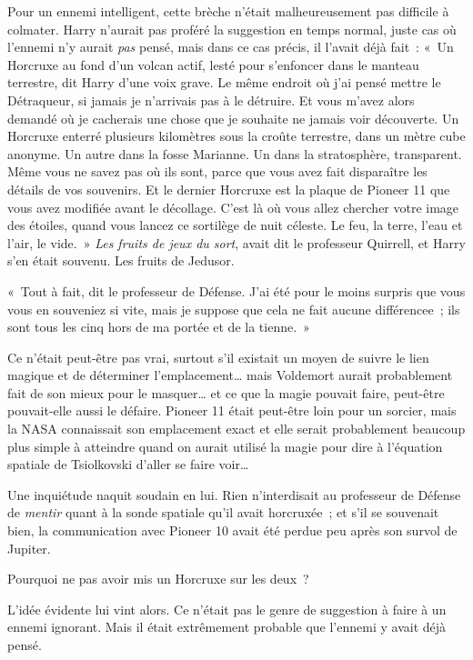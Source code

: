 Pour un ennemi intelligent, cette brèche n'était malheureusement pas difficile à colmater. Harry n'aurait pas proféré la suggestion en temps normal, juste cas où l'ennemi n'y aurait \emph{pas} pensé, mais dans ce cas précis, il l'avait déjà fait~: «~Un Horcruxe au fond d'un volcan actif, lesté pour s'enfoncer dans le manteau terrestre, dit Harry d'une voix grave. Le même endroit où j'ai pensé mettre le Détraqueur, si jamais je n'arrivais pas à le détruire. Et vous m'avez alors demandé où je cacherais une chose que je souhaite ne jamais voir découverte. Un Horcruxe enterré plusieurs kilomètres sous la croûte terrestre, dans un mètre cube anonyme. Un autre dans la fosse Marianne. Un dans la stratosphère, transparent. Même vous ne savez pas où ils sont, parce que vous avez fait disparaître les détails de vos souvenirs. Et le dernier Horcruxe est la plaque de Pioneer 11 que vous avez modifiée avant le décollage. C'est là où vous allez chercher votre image des étoiles, quand vous lancez ce sortilège de nuit céleste. Le feu, la terre, l'eau et l'air, le vide.~» \emph{Les fruits de jeux du sort}, avait dit le professeur Quirrell, et Harry s'en était souvenu. Les fruits de Jedusor.

«~Tout à fait, dit le professeur de Défense. J'ai été pour le moins surpris que vous vous en souveniez si vite, mais je suppose que cela ne fait aucune différencee~; ils sont tous les cinq hors de ma portée et de la tienne.~»

Ce n'était peut-être pas vrai, surtout s'il existait un moyen de suivre le lien magique et de déterminer l'emplacement… mais Voldemort aurait probablement fait de son mieux pour le masquer… et ce que la magie pouvait faire, peut-être pouvait-elle aussi le défaire. Pioneer 11 était peut-être loin pour un sorcier, mais la NASA connaissait son emplacement exact et elle serait probablement beaucoup plus simple à atteindre quand on aurait utilisé la magie pour dire à l'équation spatiale de Tsiolkovski d'aller se faire voir…

Une inquiétude naquit soudain en lui. Rien n'interdisait au professeur de Défense de \emph{mentir} quant à la sonde spatiale qu'il avait horcruxée~; et s'il se souvenait bien, la communication avec Pioneer 10 avait été perdue peu après son survol de Jupiter.

Pourquoi ne pas avoir mis un Horcruxe sur les deux~?

L'idée évidente lui vint alors. Ce n'était pas le genre de suggestion à faire à un ennemi ignorant. Mais il était extrêmement probable que l'ennemi y avait déjà pensé.

